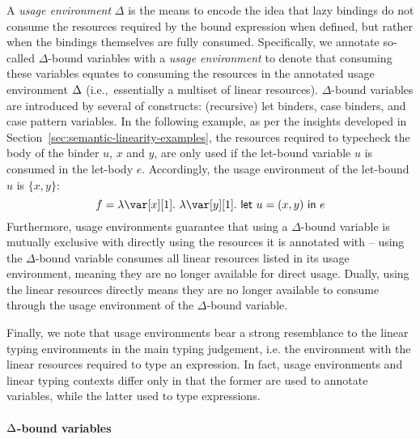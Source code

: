 \documentclass[acmsmall,review,anonymous]{acmart}
\newcommand{\llet}[2]{\mathsf{let}~#1~\mathsf{in}~#2}
\begin{document}
A \emph{usage environment} $\Delta$ is the means to encode the idea that lazy
bindings do not consume the resources required by the bound expression when
defined, but rather when the bindings themselves are fully consumed.
Specifically, we annotate so-called $\Delta$-bound variables with a \emph{usage
environment} to denote that consuming these variables equates to consuming the
resources in the annotated usage environment $\Delta$ (i.e.,~essentially a multiset of linear resources).
%
$\Delta$-bound
variables are introduced by several of constructs: (recursive) let
binders, case binders, and case pattern variables. In the following example, as
per the insights developed in
Section~\ref{sec:semantic-linearity-examples}, the resources required to
typecheck the body of the binder $u$, $x$ and $y$, are only used if
the let-bound variable
$u$ is consumed in the let-body $e$.  Accordingly, the usage environment of
the let-bound $u$ is $\{x,y\}$:
\[
f = \lambda \xl.~\lambda \y[1].~\llet{u = (x,y)}{e}
\]
Furthermore, usage environments guarantee that using a $\Delta$-bound variable
is mutually exclusive with directly using the resources it is annotated with --
using the $\Delta$-bound variable consumes all linear resources listed in its
usage environment, meaning they are no longer available for direct usage.
Dually, using the linear resources directly means they are no longer available
to consume through the usage environment of the $\Delta$-bound variable.

Finally, we note that usage environments bear a strong resemblance to the linear
typing environments in the main typing judgement,
i.e. the environment with the linear resources required to type an expression.
%
In fact, usage environments and linear typing contexts differ only in that the
former are used to annotate variables, while the latter used to type
expressions.

\paragraph{\texorpdfstring{$\Delta$}{Delta}-bound variables}
\end{document}

